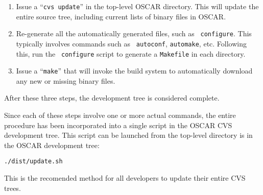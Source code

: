 \begin{enumerate}
\item Issue a ``{\tt cvs update}'' in the top-level OSCAR directory.
  This will update the entire source tree, including current lists of
  binary files in OSCAR.
  
\item Re-generate all the automatically generated files, such as {\tt
    configure}.  This typically involves commands such as {\tt
    autoconf}, {\tt automake}, etc.  Following this, run the {\tt
    configure} script to generate a {\tt Makefile} in each directory.

\item Issue a ``{\tt make}'' that will invoke the build system to
  automatically download any new or missing binary files.
\end{enumerate}

After these three steps, the development tree is considered complete.

Since each of these steps involve one or more actual commands, the
entire procedure has been incorporated into a single script in the
OSCAR CVS development tree.  This script can be launched from the
top-level directory is in the OSCAR development tree:

\vspace{10pt}
\centerline{\tt ./dist/update.sh}
\vspace{10pt}

This is the recomended method for all developers to update their
entire CVS trees.

